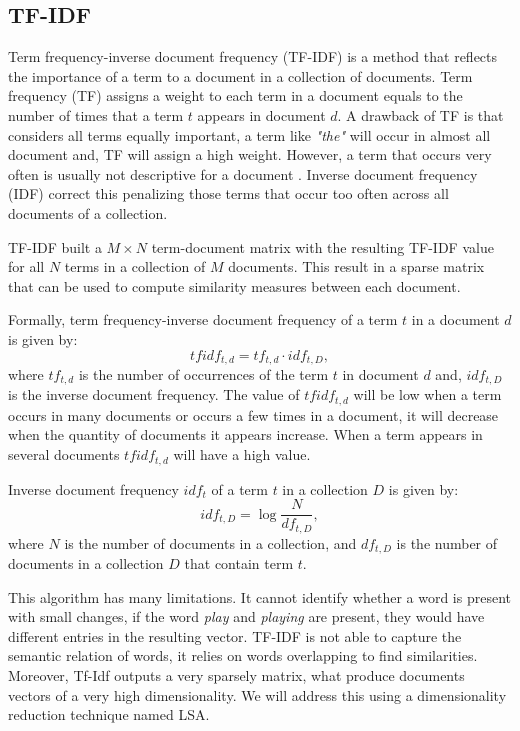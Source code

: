\subsection{TF-IDF}
Term frequency-inverse document frequency (TF-IDF) is a method that reflects the importance of a term to a document in a collection of documents. Term frequency (TF) assigns a weight to each term in a document equals to the number of times that a term $t$ appears in document $d$. A drawback of TF is that considers all terms equally important, a term like \textit{"the"} will occur in almost all document and, TF will assign a high weight. However, a term that occurs very often is usually not descriptive for a document \cite{manning2008introduction}. Inverse document frequency (IDF) correct this penalizing those terms that occur too often across all documents of a collection.

TF-IDF built a $M\times N$ term-document matrix with the resulting TF-IDF value for all $N$ terms in a collection of $M$ documents. This result in a sparse matrix that can be used to compute similarity measures between each document.

Formally, term frequency-inverse document frequency of a term $t$ in a document $d$ is given by:
$$tfidf_{t,d}=tf_{t,d} \cdot idf_{t,D},$$ 
where $tf_{t,d}$ is the number of occurrences of the term $t$ in document $d$ and, $idf_{t,D}$ is the inverse document frequency. The value of $tfidf_{t,d}$ will be low when a term occurs in many documents or occurs a few times in a document, it will decrease when the quantity of documents it appears increase. When a term appears in several documents $tfidf_{t,d}$ will have a high value\cite{manning2008introduction}.

Inverse document frequency $idf_{t}$ of a term $t$ in a collection $D$ is given by:
$$idf_{t,D} = \log{\frac{N}{df_{t,D}}},$$
where $N$ is the number of documents in a collection, and $df_{t,D}$ is the number of documents in a collection $D$ that contain term $t$.

This algorithm has many limitations. It cannot identify whether a word is present with small changes, if the word \textit{play} and \textit{playing} are present, they would have different entries in the resulting vector. TF-IDF is not able to capture the semantic relation of words, it relies on words overlapping to find similarities. Moreover, Tf-Idf outputs a very sparsely matrix, what produce documents vectors of a very high dimensionality. We will address this using a dimensionality reduction technique named LSA.

